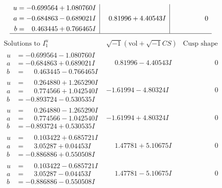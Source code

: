 \documentclass[1p]{elsarticle_modified}
\theoremstyle{definition}
\newcommand{\I}{\sqrt{-1}}
\begin{document}
$$\begin{array}{c|c|c}
\begin{aligned}
u &= -0.699564 + 1.080760 I \\
a &= -0.684863 - 0.689021 I \\
b &= \phantom{-}0.463445 + 0.766465 I\end{aligned}
 & \phantom{-}0.81996 + 4.40543 I & \phantom{-0.000000 } 0\\
 \hline 
 \end{array}$$\newpage$$\begin{array}{c|c|c}  
\text{Solutions to }I^u_{1}& \I (\text{vol} + \sqrt{-1}CS) & \text{Cusp shape}\\
 \hline 
\begin{aligned}
u &= -0.699564 - 1.080760 I \\
a &= -0.684863 + 0.689021 I \\
b &= \phantom{-}0.463445 - 0.766465 I\end{aligned}
 & \phantom{-}0.81996 - 4.40543 I & \phantom{-0.000000 } 0 \\ \hline\begin{aligned}
u &= \phantom{-}0.264880 + 1.265290 I \\
a &= \phantom{-}0.774566 + 1.042540 I \\
b &= -0.893724 - 0.530535 I\end{aligned}
 & -1.61994 - 4.80324 I & \phantom{-0.000000 } 0 \\ \hline\begin{aligned}
u &= \phantom{-}0.264880 - 1.265290 I \\
a &= \phantom{-}0.774566 - 1.042540 I \\
b &= -0.893724 + 0.530535 I\end{aligned}
 & -1.61994 + 4.80324 I & \phantom{-0.000000 } 0 \\ \hline\begin{aligned}
u &= \phantom{-}0.103422 + 0.685721 I \\
a &= \phantom{-}3.05287 + 0.04453 I \\
b &= -0.886886 + 0.550508 I\end{aligned}
 & \phantom{-}1.47781 + 5.10675 I & \phantom{-0.000000 } 0 \\ \hline\begin{aligned}
u &= \phantom{-}0.103422 - 0.685721 I \\
a &= \phantom{-}3.05287 - 0.04453 I \\
b &= -0.886886 - 0.550508 I\end{aligned}
 & \phantom{-}1.47781 - 5.10675 I & \phantom{-0.000000 } 0 \\ \hline\begin{aligned}

\end{aligned}
\end{array}$$
\end{document}
